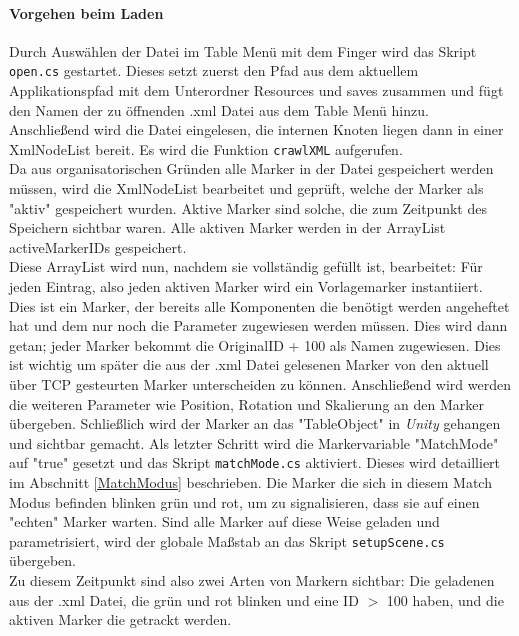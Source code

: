 \paragraph{Vorgehen beim Laden} Durch Auswählen der Datei im Table Menü mit dem Finger wird das Skript \texttt{open.cs} gestartet. Dieses setzt zuerst den Pfad aus dem aktuellem Applikationspfad mit dem Unterordner Resources und saves zusammen und fügt den Namen der zu öffnenden .xml Datei aus dem Table Menü hinzu. Anschließend wird die Datei eingelesen, die internen Knoten liegen dann in einer XmlNodeList bereit. Es wird die Funktion \texttt{crawlXML} aufgerufen.\\
Da aus organisatorischen Gründen alle Marker in der Datei gespeichert werden müssen, wird die XmlNodeList bearbeitet und geprüft, welche der Marker als "aktiv" gespeichert wurden. Aktive Marker sind solche, die zum Zeitpunkt des Speichern sichtbar waren. Alle aktiven Marker werden in der ArrayList activeMarkerIDs gespeichert.\\
Diese ArrayList wird nun, nachdem sie vollständig gefüllt ist, bearbeitet: Für jeden Eintrag, also jeden aktiven Marker wird ein Vorlagemarker instantiiert. Dies ist ein Marker, der bereits alle Komponenten die benötigt werden angeheftet hat und dem nur noch die Parameter zugewiesen werden müssen. Dies wird dann getan; jeder Marker bekommt die OriginalID + 100 als Namen zugewiesen. Dies ist wichtig um später die aus der .xml Datei gelesenen Marker von den aktuell über TCP gesteurten Marker unterscheiden zu können. Anschließend wird werden die weiteren Parameter wie Position, Rotation und Skalierung an den Marker übergeben. Schließlich wird der Marker an das "TableObject" in \textit{Unity} gehangen und sichtbar gemacht. Als letzter Schritt wird die Markervariable "MatchMode" auf "true" gesetzt und das Skript \texttt{matchMode.cs} aktiviert. Dieses wird detailliert im Abschnitt \ref{MatchModus} beschrieben. Die Marker die sich in diesem Match Modus befinden blinken grün und rot, um zu signalisieren, dass sie auf einen "echten" Marker warten.
Sind alle Marker auf diese Weise geladen und parametrisiert, wird der globale Maßstab an das Skript \texttt{setupScene.cs} übergeben.\\
Zu diesem Zeitpunkt sind also zwei Arten von Markern sichtbar: Die geladenen aus der .xml Datei, die grün und rot blinken und eine ID $>$ 100 haben, und die aktiven Marker die getrackt werden.

